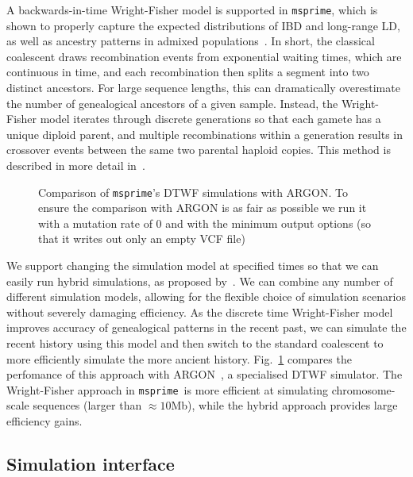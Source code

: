 \documentclass{article}
\newcommand{\msprime}[0]{\texttt{msprime}}
\begin{document}
A backwards-in-time Wright-Fisher model is supported in \msprime, which is
shown to properly capture the expected distributions of IBD and long-range LD,
as well as ancestry patterns in admixed
populations~\citep{nelson2020accounting}. In short, the classical coalescent
draws recombination events from exponential waiting times, which are continuous
in time, and each recombination then splits a segment into two distinct
ancestors. For large sequence lengths, this can dramatically overestimate the
number of genealogical ancestors of a given sample. Instead, the Wright-Fisher
model iterates through discrete generations so that each gamete has a unique
diploid parent, and multiple recombinations within a generation results in
crossover events between the same two parental haploid copies.  This method is
described in more detail in~\cite{nelson2020accounting}.

\begin{figure}
\begin{center}
\end{center}
\caption{\label{fig-dtwf-perf} Comparison of \msprime's DTWF
simulations with ARGON. To ensure the comparison with ARGON is
as fair as possible we run it with a mutation rate of 0 and with
the minimum output options (so that it writes out only an empty VCF file)}
\end{figure}

We support changing the simulation model at specified times so that we can
easily run hybrid simulations, as proposed by~\cite{bhaskar2014distortion}. We
can combine any number of different simulation models, allowing for the
flexible choice of simulation scenarios without severely damaging efficiency.
As the discrete time Wright-Fisher model improves accuracy of genealogical
patterns in the recent past, we can simulate the recent history using this
model and then switch to the standard coalescent to more efficiently simulate
the more ancient history. Fig.~\ref{fig-dtwf-perf} compares the perfomance of
this approach with ARGON~\citep{palamara2016argon}, a specialised DTWF
simulator.  The Wright-Fisher approach in \msprime\ is more efficient at
simulating chromosome-scale sequences (larger than $\approx10$Mb), while the
hybrid approach provides large efficiency gains.


\subsection*{Simulation interface}
\end{document}
